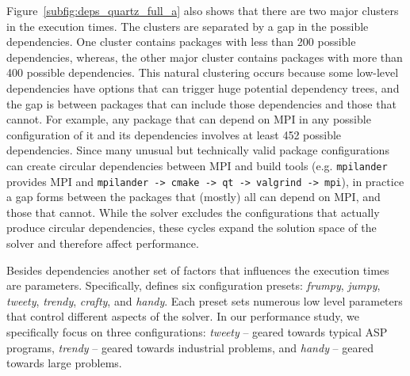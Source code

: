 Figure~\ref{subfig:deps_quartz_full_a} also shows that there are two major clusters in the execution times. The clusters are separated by a gap in the possible dependencies. One cluster contains packages with less than 200 possible dependencies, whereas, the other major cluster contains packages with more than 400 possible dependencies. This natural clustering occurs because some low-level dependencies have options that can trigger huge potential dependency trees, and the gap is between packages that can include those dependencies and those that cannot. For example, any package that can depend on MPI in any possible configuration of it and its dependencies involves at least 452 possible dependencies. Since many unusual but technically valid package configurations can create circular dependencies between MPI and build tools (e.g. \texttt{mpilander} provides MPI and \texttt{mpilander -> cmake -> qt -> valgrind -> mpi}), in practice a gap forms between the packages that (mostly) all can depend on MPI, and those that cannot. While the solver excludes the configurations that actually produce circular dependencies, these cycles expand the solution space of the solver and therefore affect performance.


% 

% 

% 

Besides dependencies another set of factors that influences the execution times are \clingo{} parameters. Specifically, \clingo{} defines six configuration presets: \emph{frumpy}, \emph{jumpy}, \emph{tweety}, \emph{trendy}, \emph{crafty}, and \emph{handy}. Each preset sets numerous low level parameters that control different aspects of the solver. In our performance study, we specifically focus on three configurations: \emph{tweety} -- geared towards typical ASP programs, \emph{trendy} -- geared towards industrial problems, and \emph{handy} -- geared towards large problems.

